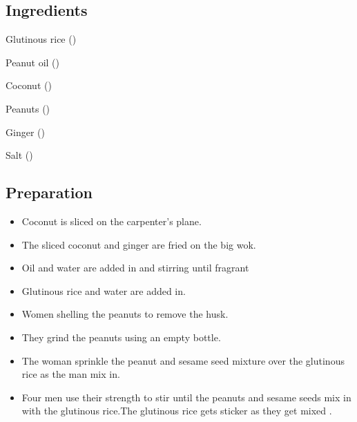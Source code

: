 \documentclass[conference]{IEEEtran}
\begin{document}
\subsection{Ingredients}
\label{subsec:HMNIngredient}
\begin{description}
   \item Glutinous rice ()
   \item Peanut oil ()
   \item Coconut ()
   \item Peanuts ()
   \item Ginger ()
   \item Salt ()
\end{description}

\subsection{Preparation}
\label{subsec:HMNPreparation}
 \renewcommand{\labelitemi}{$\blacksquare$}
 \begin{itemize}
   \item  Coconut is sliced on the carpenter's plane.
 \end{itemize}
 \begin{itemize}
   \item  The sliced coconut and ginger are fried on the big wok.
 \end{itemize}
\begin{itemize}
   \item  Oil and water are added in and stirring until fragrant
 \end{itemize}
\begin{itemize}
   \item  Glutinous rice and water are added in.
 \end{itemize}
\begin{itemize}
   \item  Women shelling the peanuts to remove the husk.
 \end{itemize}
\begin{itemize}
   \item  They grind the peanuts using an empty bottle.
 \end{itemize}
\begin{itemize}
   \item  The woman sprinkle the peanut and sesame seed mixture over the glutinous rice as the man mix in.
 \end{itemize}
\begin{itemize}
   \item  Four men use their strength to stir until the peanuts and sesame seeds mix in with the glutinous rice.The glutinous rice gets sticker as they get mixed \cite{b7}.
 \end{itemize}
\end{document}
